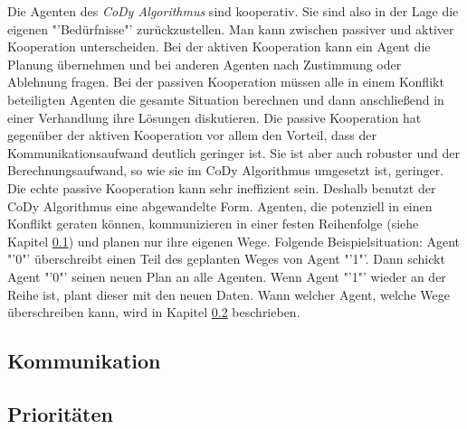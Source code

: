 Die Agenten des \textit{CoDy Algorithmus} sind kooperativ. Sie sind also in der Lage die eigenen "'Bedürfnisse"' zurückzustellen. Man kann zwischen passiver und aktiver Kooperation unterscheiden. Bei der aktiven Kooperation kann ein Agent die Planung übernehmen und bei anderen Agenten nach Zustimmung oder Ablehnung fragen. Bei der passiven Kooperation müssen alle in einem Konflikt beteiligten Agenten die gesamte Situation berechnen und dann anschließend in einer Verhandlung ihre Lösungen diskutieren. Die passive Kooperation hat gegenüber der aktiven Kooperation vor allem den Vorteil, dass der Kommunikationsaufwand deutlich geringer ist. Sie ist aber auch robuster und der Berechnungsaufwand, so wie sie im CoDy Algorithmus umgesetzt ist, geringer. Die echte passive Kooperation kann sehr ineffizient sein. Deshalb benutzt der CoDy Algorithmus eine abgewandelte Form. Agenten, die potenziell in einen Konflikt geraten können, kommunizieren in einer festen Reihenfolge (siehe Kapitel \ref{chap:kommunikation}) und planen nur ihre eigenen Wege. \cite{book:regele}\newline Folgende Beispielsituation:
Agent "'0"' überschreibt einen Teil des geplanten Weges von Agent "'1"'. Dann schickt Agent "'0"' seinen neuen Plan an alle Agenten. Wenn Agent "'1"' wieder an der Reihe ist, plant dieser mit den neuen Daten. Wann welcher Agent, welche Wege überschreiben kann, wird in Kapitel \ref{chap:prioritaeten} beschrieben.

\subsection{Kommunikation}
\label{chap:kommunikation}

%
\subsection{Prioritäten}
\label{chap:prioritaeten}
